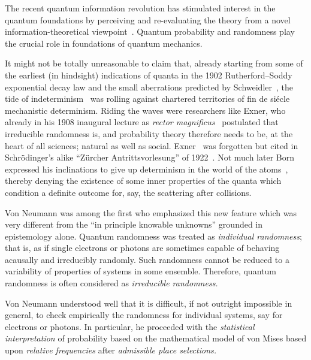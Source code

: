\documentclass[entropy,editorial,accept,moreauthors,pdftex,10pt,a4paper]{Definitions/mdpi}
\begin{document}
\maketitle

The recent quantum information revolution has stimulated interest in the quantum foundations
 by perceiving and re-evaluating
the theory from  a  novel information-theoretical v\mbox{iewpoint \cite{P1,P2,P3,P4,P5}.}
Quantum probability and randomness play the crucial role in foundations of quantum mechanics.

It might not be totally unreasonable to claim that,
already starting from some of the earliest (in hindsight) indications of
quanta in the 1902 Rutherford--Soddy exponential decay law and the small aberrations
predicted by Schweidler~\cite{schweidler-1905},
the tide of indeterminism~\cite{Hiebert2000,Stoeltzner1999} was rolling against chartered territories of
fin de si\'ecle mechanistic determinism.
Riding the waves were researchers like Exner,
who already in his 1908 inaugural lecture as
{\it rector magnificus}~\cite{Exner-1908}
postulated that irreducible randomness is, and probability theory therefore needs to be, at the heart of all sciences;
natural as well as social.
Exner~\cite{Exner-1919} was forgotten but
cited in Schr\"odinger's alike ``Z\"urcher Antrittsvorlesung'' of 1922~\cite{schrodinger-1929}.
Not much later Born expressed his inclinations to give up determinism in the world of the atoms~\cite{born-26-1},
thereby denying the existence of some inner properties of the quanta
which condition a definite outcome for, say, the scattering after collisions.

Von Neumann \cite{VN} was  among  the first who emphasized  this new feature which was very different from
the ``in principle knowable unknowns'' grounded in epistemology alone.
Quantum randomness was treated as {\it individual randomness}; that is, as if single electrons or photons
are sometimes capable of behaving acausally and irreducibly randomly. %
Such randomness cannot be reduced to a variability of properties of systems in some ensemble.
Therefore, quantum randomness is often considered as {\it irreducible randomness.}

Von Neumann understood well that it is difficult, if
not outright impossible in general,
to check  empirically the randomness for individual systems, say for electrons or photons.
In particular, he
proceeded with the {\it statistical interpretation}
of probability based on the mathematical model of von Mises \cite{MI1, MI2}
 based upon  {\it relative frequencies} after {\it admissible place selections.}
\end{document}
